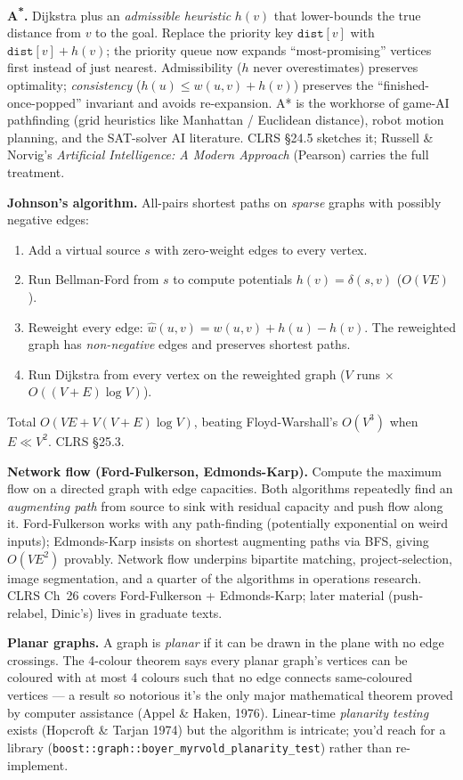 \documentclass[11pt]{article}
\begin{document}
\begin{notebox}
\textbf{A\textsuperscript{*}.} Dijkstra plus an \emph{admissible
heuristic} $h(v)$ that lower-bounds the true distance from $v$ to
the goal. Replace the priority key
$\texttt{dist}[v]$ with $\texttt{dist}[v] + h(v)$; the priority
queue now expands ``most-promising'' vertices first instead of
just nearest. Admissibility ($h$ never overestimates) preserves
optimality; \emph{consistency}
($h(u) \le w(u,v) + h(v)$) preserves the
``finished-once-popped'' invariant and avoids re-expansion. A* is
the workhorse of game-AI pathfinding (grid heuristics like
Manhattan / Euclidean distance), robot motion planning, and the
SAT-solver AI literature. CLRS \S24.5 sketches it; Russell \&
Norvig's \emph{Artificial Intelligence: A Modern Approach}
(Pearson) carries the full treatment.

\smallskip
\textbf{Johnson's algorithm.} All-pairs shortest paths on
\emph{sparse} graphs with possibly negative edges:
\begin{enumerate}
    \item Add a virtual source $s$ with zero-weight edges to every
          vertex.
    \item Run Bellman-Ford from $s$ to compute potentials
          $h(v) = \delta(s, v)$ ($O(VE)$).
    \item Reweight every edge: $\hat{w}(u, v) = w(u, v) + h(u) - h(v)$.
          The reweighted graph has \emph{non-negative} edges and
          preserves shortest paths.
    \item Run Dijkstra from every vertex on the reweighted graph
          ($V$ runs $\times$ $O((V{+}E)\log V)$).
\end{enumerate}
Total $O(VE + V(V+E)\log V)$, beating Floyd-Warshall's $O(V^3)$
when $E \ll V^2$. CLRS \S25.3.

\smallskip
\textbf{Network flow (Ford-Fulkerson, Edmonds-Karp).} Compute the
maximum flow on a directed graph with edge capacities. Both
algorithms repeatedly find an \emph{augmenting path} from source
to sink with residual capacity and push flow along it.
Ford-Fulkerson works with any path-finding (potentially
exponential on weird inputs); Edmonds-Karp insists on shortest
augmenting paths via BFS, giving $O(VE^2)$ provably. Network flow
underpins bipartite matching, project-selection, image
segmentation, and a quarter of the algorithms in operations
research. CLRS Ch~26 covers Ford-Fulkerson + Edmonds-Karp; later
material (push-relabel, Dinic's) lives in graduate texts.

\smallskip
\textbf{Planar graphs.} A graph is \emph{planar} if it can be
drawn in the plane with no edge crossings. The 4-colour theorem
says every planar graph's vertices can be coloured with at most
4 colours such that no edge connects same-coloured vertices ---
a result so notorious it's the only major mathematical theorem
proved by computer assistance (Appel \& Haken, 1976). Linear-time
\emph{planarity testing} exists (Hopcroft \& Tarjan 1974) but the
algorithm is intricate; you'd reach for a library
(\texttt{boost::graph::boyer\_myrvold\_planarity\_test}) rather
than re-implement.
\end{notebox}
\end{document}
